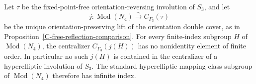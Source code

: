 \begin{proposition}
\label{C-no-finite-index-hyperelliptic}
Let $\tau$ be the fixed-point-free orientation-reversing involution
of $S_3$, and let
\[
 j:\operatorname{Mod}(N_4)
      \xrightarrow{\;\sim\;}C_{\Gamma_3}(\tau)
\]
be the unique orientation-preserving lift of the orientation double
cover, as in Proposition~\ref{C-free-reflection-comparison}.
For every finite-index subgroup $H$ of $\operatorname{Mod}(N_4)$,
the centralizer $C_{\Gamma_3}(j(H))$ has no nonidentity element of
finite order. In particular no such $j(H)$ is contained in the
centralizer of a hyperelliptic involution of $S_3$.
The standard hyperelliptic mapping class subgroup of
$\operatorname{Mod}(N_4)$ therefore has infinite index.
\end{proposition}
